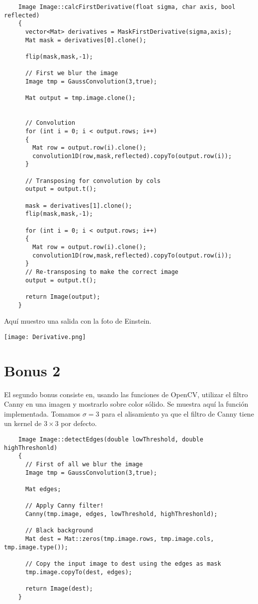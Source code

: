\documentclass[a4paper, 11pt]{article}
\theoremstyle{definition}
\begin{document}
  \begin{lstlisting}
    Image Image::calcFirstDerivative(float sigma, char axis, bool reflected)
    {
      vector<Mat> derivatives = MaskFirstDerivative(sigma,axis);
      Mat mask = derivatives[0].clone();

      flip(mask,mask,-1);

      // First we blur the image
      Image tmp = GaussConvolution(3,true);

      Mat output = tmp.image.clone();


      // Convolution
      for (int i = 0; i < output.rows; i++)
      {
        Mat row = output.row(i).clone();
        convolution1D(row,mask,reflected).copyTo(output.row(i));
      }

      // Transposing for convolution by cols
      output = output.t();

      mask = derivatives[1].clone();
      flip(mask,mask,-1);

      for (int i = 0; i < output.rows; i++)
      {
        Mat row = output.row(i).clone();
        convolution1D(row,mask,reflected).copyTo(output.row(i));
      }
      // Re-transposing to make the correct image
      output = output.t();

      return Image(output);
    }
  \end{lstlisting}

  Aquí muestro una salida con la foto de Einstein.

  \centerline{\texttt{[image: Derivative.png]}}

  \section{Bonus 2}

  El segundo bonus consiste en, usando las funciones de OpenCV, utilizar el filtro
  Canny en una imagen y mostrarlo sobre color sólido. Se muestra aquí la función
  implementada. Tomamos $\sigma=3$ para el alisamiento ya que el filtro de Canny
  tiene un kernel de $3\times3$ por defecto.

  \begin{lstlisting}
    Image Image::detectEdges(double lowThreshold, double highThreshonld)
    {
      // First of all we blur the image
      Image tmp = GaussConvolution(3,true);

      Mat edges;

      // Apply Canny filter!
      Canny(tmp.image, edges, lowThreshold, highThreshonld);

      // Black background
      Mat dest = Mat::zeros(tmp.image.rows, tmp.image.cols, tmp.image.type());

      // Copy the input image to dest using the edges as mask
      tmp.image.copyTo(dest, edges);

      return Image(dest);
    }
  \end{lstlisting}
\end{document}
